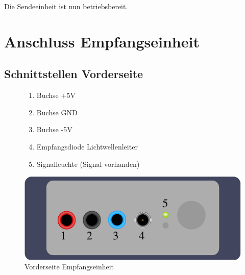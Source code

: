 \documentclass[10pt,a4paper]{scrartcl}
\begin{document}
Die Sendeeinheit ist nun betriebsbereit. 


\section{Anschluss Empfangseinheit}
\subsection{Schnittstellen Vorderseite}
\begin{figure}[H]
\begin{minipage}[t]{6cm}
\vspace{0pt}
\begin{enumerate}
\item Buchse +5V
\item Buchse GND
\item Buchse -5V
\item Empfangsdiode Lichtwellenleiter
\item Signalleuchte (Signal vorhanden)
\end{enumerate}
\centering
\end{minipage}
\hfill
\begin{minipage}[t]{6.5cm}
\vspace{0pt}
\includegraphics[scale=0.7]{gfx/rx-front.pdf}
\caption{Vorderseite Empfangseinheit}
\label{fig:Bild3}
\end{minipage}
\end{figure}
\end{document}
